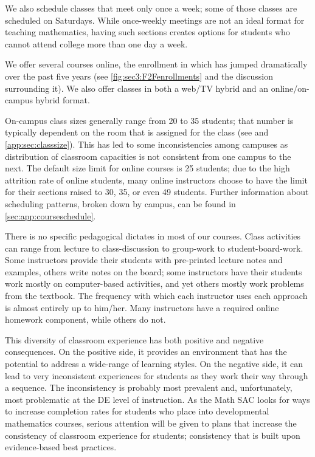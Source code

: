 We also schedule classes that meet only once a week; some of those classes are
scheduled on  Saturdays.   While once-weekly meetings are not an ideal format for
teaching mathematics, having such sections creates options for students who
cannot attend college more than one day a week.  

We offer several courses online, the enrollment in which has jumped
dramatically over the past five years (see \vref{fig:sec3:F2Fenrollments} and the discussion
surrounding it).  We also offer classes in both a web/TV hybrid and an online/on-campus hybrid format.

On-campus class sizes generally range from 20 to 35 students; that number is
typically dependent on the room that is assigned for the class (see  and 
\vref{app:sec:classsize}).  This has led
to some inconsistencies among campuses as distribution of classroom capacities
is not consistent from one campus to the next.   
The default size limit for online courses is 25 students; due to the high
attrition rate of online students, many online instructors choose to have
the limit for their sections raised to 30, 35, or even 49 students. Further information about scheduling patterns, broken down by campus, can be found in \vref{sec:app:courseschedule}.

There is no specific pedagogical dictates in most of our courses.  Class
activities can range from lecture to class-discussion to group-work to
student-board-work. Some instructors provide their students with pre-printed
lecture notes and examples, others write notes on the board; some instructors
have their students work mostly on computer-based activities, and yet others
mostly work problems from the textbook. The frequency with which each
instructor uses each approach is almost entirely up to him/her.  Many
instructors have a required online homework component, while others do not.

This diversity of classroom experience has both positive and negative
consequences.  On the positive side, it provides an environment that has the
potential to address a wide-range of learning styles.  On the negative side, it
can lead to very inconsistent experiences for students as they work their way
through a sequence.  The inconsistency is probably most prevalent and,
unfortunately, most  problematic at the DE level of instruction.  
As the Math SAC looks for ways to increase completion rates for students who
place into developmental mathematics courses, serious attention will be given
to plans that increase the consistency of classroom experience for students;
consistency that is built upon evidence-based best practices.
